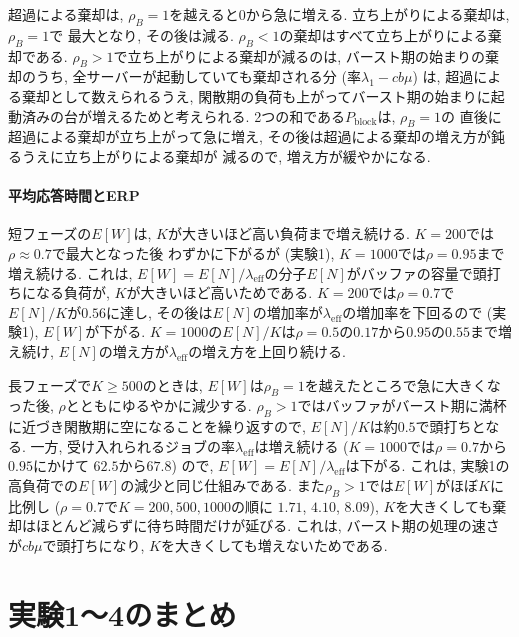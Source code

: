 \documentclass[a4paper, 11pt, dvipdfmx]{jsreport}
\begin{document}
超過による棄却は, $\rho_B = 1$を越えると$0$から急に増える. 立ち上がりによる棄却は, $\rho_B = 1$で
最大となり, その後は減る. $\rho_B < 1$の棄却はすべて立ち上がりによる棄却である.
$\rho_B > 1$で立ち上がりによる棄却が減るのは, バースト期の始まりの棄却のうち, 全サーバーが起動していても棄却される分
(率$\lambda_1 - cb\mu$) は, 超過による棄却として数えられるうえ, 閑散期の負荷も上がってバースト期の始まりに起動済みの台が増えるためと考えられる. 2つの和である$P_{\mathrm{block}}$は, $\rho_B = 1$の
直後に超過による棄却が立ち上がって急に増え, その後は超過による棄却の増え方が鈍るうえに立ち上がりによる棄却が
減るので, 増え方が緩やかになる.

\paragraph{平均応答時間とERP}
短フェーズの$E[W]$は, $K$が大きいほど高い負荷まで増え続ける. $K = 200$では$\rho \approx 0.7$で最大となった後
わずかに下がるが (実験1), $K = 1000$では$\rho = 0.95$まで増え続ける. これは, $E[W] = E[N]/\lambda_{\mathrm{eff}}$の分子$E[N]$がバッファの容量で頭打ちになる負荷が, $K$が大きいほど高いためである.
$K = 200$では$\rho = 0.7$で$E[N]/K$が$0.56$に達し, その後は$E[N]$の増加率が$\lambda_{\mathrm{eff}}$の増加率を下回るので (実験1), $E[W]$が下がる.
$K = 1000$の$E[N]/K$は$\rho = 0.5$の$0.17$から$0.95$の$0.55$まで増え続け, $E[N]$の増え方が$\lambda_{\mathrm{eff}}$の増え方を上回り続ける.


長フェーズで$K \ge 500$のときは, $E[W]$は$\rho_B = 1$を越えたところで急に大きくなった後, $\rho$とともにゆるやかに減少する.
$\rho_B > 1$ではバッファがバースト期に満杯に近づき閑散期に空になることを繰り返すので, $E[N]/K$は約$0.5$で頭打ちとなる.
一方, 受け入れられるジョブの率$\lambda_{\mathrm{eff}}$は増え続ける ($K = 1000$では$\rho = 0.7$から$0.95$にかけて
$62.5$から$67.8$) ので, $E[W] = E[N]/\lambda_{\mathrm{eff}}$は下がる. これは, 実験1の高負荷での$E[W]$の減少と同じ仕組みである. また$\rho_B > 1$では$E[W]$がほぼ$K$に比例し ($\rho = 0.7$で$K = 200, 500, 1000$の順に
$1.71$, $4.10$, $8.09$), $K$を大きくしても棄却はほとんど減らずに待ち時間だけが延びる.
これは, バースト期の処理の速さが$cb\mu$で頭打ちになり, $K$を大きくしても増えないためである.

\section{実験1〜4のまとめ}
\label{sec:exp1-4-summary}
\end{document}
